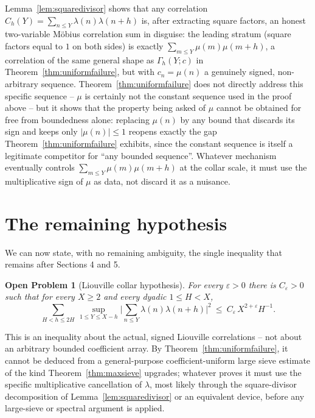 \documentclass[11pt]{article}
\newtheorem{openproblem}[theorem]{Open Problem}
\begin{document}
Lemma~\ref{lem:squaredivisor} shows that any correlation $C_h(Y)=\sum_{n\le Y}\lambda(n)\lambda(n+h)$ is,
after extracting square factors, an honest two-variable M\"obius correlation sum in disguise: the leading
stratum (square factors equal to $1$ on both sides) is exactly $\sum_{m\le Y}\mu(m)\mu(m+h)$, a correlation
of the same general shape as $\Gamma_h(Y;c)$ in Theorem~\ref{thm:uniformfailure}, but with $c_n=\mu(n)$ a
genuinely signed, non-arbitrary sequence. Theorem~\ref{thm:uniformfailure} does not directly address this
specific sequence -- $\mu$ is certainly not the constant sequence used in the proof above -- but it shows
that the property being asked of $\mu$ cannot be obtained for free from boundedness alone: replacing
$\mu(n)$ by any bound that discards its sign and keeps only $|\mu(n)|\le1$ reopens exactly the gap
Theorem~\ref{thm:uniformfailure} exhibits, since the constant sequence is itself a legitimate competitor for
``any bounded sequence''. Whatever mechanism eventually controls $\sum_{m\le Y}\mu(m)\mu(m+h)$ at the
collar scale, it must use the multiplicative sign of $\mu$ as data, not discard it as a nuisance.

\section{The remaining hypothesis}

We can now state, with no remaining ambiguity, the single inequality that remains after Sections
4 and 5.

\begin{openproblem}[Liouville collar hypothesis]
\label{hyp:lch}
For every $\varepsilon>0$ there is $C_\varepsilon>0$ such that for every $X\ge2$ and every dyadic
$1\le H<X$,
\[
\sum_{H<h\le2H}\,\sup_{1\le Y\le X-h}\Big|\sum_{n\le Y}\lambda(n)\lambda(n+h)\Big|^2\ \le\ C_\varepsilon\,X^{2+\varepsilon}H^{-1}.
\]
\end{openproblem}

This is an inequality about the actual, signed Liouville correlations -- not about an arbitrary bounded
coefficient array. By Theorem~\ref{thm:uniformfailure}, it cannot be deduced from a general-purpose
coefficient-uniform large sieve estimate of the kind Theorem~\ref{thm:maxsieve} upgrades; whatever proves
it must use the specific multiplicative cancellation of $\lambda$, most likely through the square-divisor
decomposition of Lemma~\ref{lem:squaredivisor} or an equivalent device, before any large-sieve or spectral
argument is applied.
\end{document}
